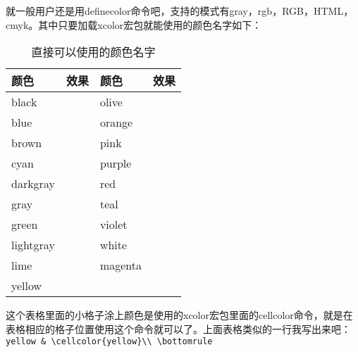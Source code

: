 就一般用户还是用definecolor命令吧，支持的模式有gray，rgb，RGB，HTML，cmyk。其中只要加载xcolor宏包就能使用的颜色名字如下：
\begin{table}[h]
\begin{tabular}{@{}lp{50pt}lp{50pt}@{}}
\toprule
颜色        & 效果  & 颜色       & 效果\\ \midrule
black     &  \cellcolor{black}  & olive     &    \cellcolor{olive} \\
blue      &   \cellcolor{blue} & orange    &   \cellcolor{orange}\\
brown     &  \cellcolor{brown}  & pink      &   \cellcolor{pink}\\
cyan      &   \cellcolor{cyan} & purple    &   \cellcolor{purple}\\
darkgray  &  \cellcolor{darkgray} &red       &   \cellcolor{red}  \\
gray      &   \cellcolor{gray} & teal      &    \cellcolor{teal}\\
green     &   \cellcolor{green} & violet    &   \cellcolor{violet}\\
lightgray &  \cellcolor{lightgray} &white     &   \cellcolor{white} \\
lime      &    \cellcolor{lime} & magenta   &   \cellcolor{magenta} \\
yellow    &    \cellcolor{yellow}\\ \bottomrule
\end{tabular}
\label{tab:直接可以使用的颜色名字}
\caption{直接可以使用的颜色名字}
\end{table}
这个表格里面的小格子涂上颜色是使用的xcolor宏包里面的cellcolor命令，就是在表格相应的格子位置使用这个命令就可以了。上面表格类似的一行我写出来吧：\\
\verb+yellow & \cellcolor{yellow}\\ \bottomrule+

